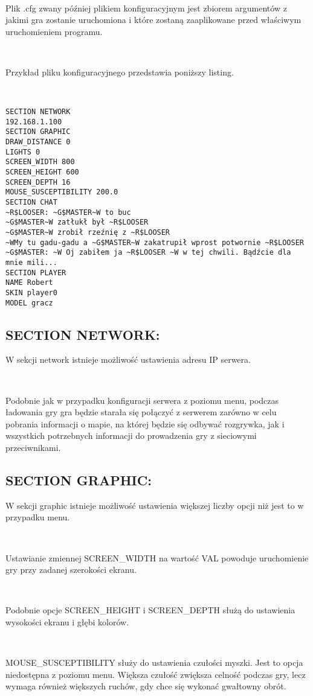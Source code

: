 \documentclass[licencjacka]{pracamgr}
\begin{document}
\ \

Plik .cfg zwany później plikiem konfiguracyjnym jest zbiorem argumentów z jakimi gra zostanie uruchomiona i które zostaną zaaplikowane przed właściwym uruchomieniem programu.

\ \

Przykład pliku konfiguracyjnego przedstawia poniższy listing.

\ \

\begin{verbatim}
SECTION NETWORK
192.168.1.100
SECTION GRAPHIC
DRAW_DISTANCE 0
LIGHTS 0
SCREEN_WIDTH 800
SCREEN_HEIGHT 600
SCREEN_DEPTH 16
MOUSE_SUSCEPTIBILITY 200.0
SECTION CHAT
~R$LOOSER: ~G$MASTER~W to buc
~G$MASTER~W zatłukł był ~R$LOOSER
~G$MASTER~W zrobił rzeźnię z ~R$LOOSER
~WMy tu gadu-gadu a ~G$MASTER~W zakatrupił wprost potwornie ~R$LOOSER
~G$MASTER: ~W Oj zabiłem ja ~R$LOOSER ~W w tej chwili. Bądźcie dla mnie mili...
SECTION PLAYER
NAME Robert
SKIN player0
MODEL gracz
\end{verbatim}

\subsection{SECTION NETWORK:}

W sekcji network istnieje możliwość ustawienia adresu IP serwera.

\ \

Podobnie jak w przypadku konfiguracji serwera z poziomu menu, podczas ładowania gry gra będzie starała się połączyć z serwerem zarówno w celu pobrania informacji o mapie, na której będzie się odbywać rozgrywka, jak i wszystkich potrzebnych informacji do prowadzenia gry z sieciowymi przeciwnikami.

\subsection{SECTION GRAPHIC:}

W sekcji graphic istnieje możliwość ustawienia większej liczby opcji niż jest to w przypadku menu.

\ \

Ustawianie zmiennej SCREEN\_WIDTH na wartość VAL powoduje uruchomienie gry przy zadanej szerokości ekranu.

\ \

Podobnie opcje SCREEN\_HEIGHT i SCREEN\_DEPTH służą do ustawienia wysokości ekranu i głębi kolorów.

\ \

MOUSE\_SUSCEPTIBILITY służy do ustawienia czułości myszki. Jest to opcja niedostępna z poziomu menu. Większa czułość zwiększa celność podczas gry, lecz wymaga również większych ruchów, gdy chce się wykonać gwałtowny obrót.
\end{document}

